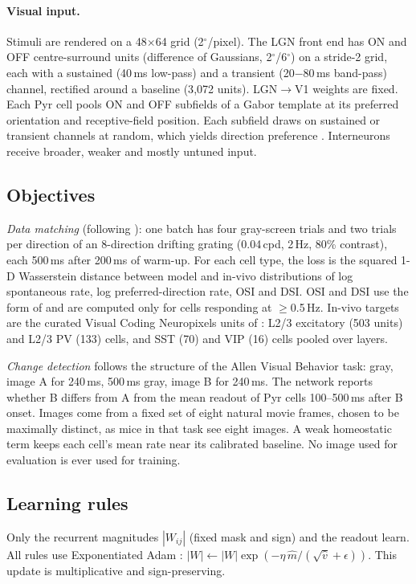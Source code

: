 \paragraph{Visual input.} Stimuli are rendered on a 48$\times$64 grid (2$^\circ$/pixel). The LGN
front end has ON and OFF centre-surround units (difference of Gaussians, 2$^\circ$/6$^\circ$) on a
stride-2 grid, each with a sustained (40\,ms low-pass) and a transient (20$-$80\,ms band-pass)
channel, rectified around a baseline (3{,}072 units). LGN$\to$V1 weights are fixed. Each Pyr cell
pools ON and OFF subfields of a Gabor template at its preferred orientation and receptive-field
position. Each subfield draws on sustained or transient channels at random, which yields direction
preference \citep{lien2018}. Interneurons receive broader, weaker and mostly untuned input.

\subsection{Objectives}
\emph{Data matching} (following \citealp{ito2026}): one batch has four gray-screen trials and two
trials per direction of an 8-direction drifting grating (0.04\,cpd, 2\,Hz, 80\% contrast), each
500\,ms after 200\,ms of warm-up. For each cell type, the loss is the squared 1-D Wasserstein
distance between model and in-vivo distributions of log spontaneous rate, log preferred-direction
rate, OSI and DSI. OSI and DSI use the form of \citet{ito2026} and are computed only for cells
responding at $\ge$0.5\,Hz. In-vivo targets are the curated Visual Coding Neuropixels units of
\citet{ito2026} \citep{siegle2021}: L2/3 excitatory (503 units) and L2/3 PV (133) cells, and SST (70)
and VIP (16) cells pooled over layers.

\emph{Change detection} follows the structure of the Allen Visual Behavior task: gray, image A for
240\,ms, 500\,ms gray, image B for 240\,ms. The network reports whether B differs from A from the
mean readout of Pyr cells 100--500\,ms after B onset. Images come from a fixed set of eight natural
movie frames, chosen to be maximally distinct, as mice in that task see eight images. A weak
homeostatic term keeps each cell's mean rate near its calibrated baseline. No image used for
evaluation is ever used for training.

\subsection{Learning rules}
Only the recurrent magnitudes $|W_{ij}|$ (fixed mask and sign) and the readout learn. All rules
use Exponentiated Adam \citep{ito2026,cornford2024egd}: $|W|\leftarrow|W|\exp(-\eta\,\hat m/(\sqrt{\hat
v}+\epsilon))$. This update is multiplicative and sign-preserving.

